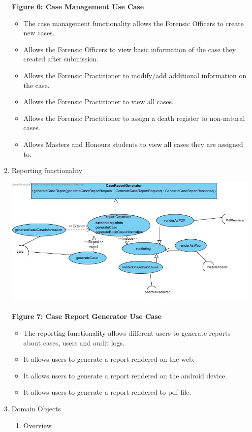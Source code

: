 \documentclass[10pt,a4paper]{article}
\begin{document}
\begin{enumerate}
\begin{center}
		\textbf{Figure 6: Case Management Use Case}
	\end{center}
	\begin{itemize}
		\item The case management functionality allows the Forensic Officers to create new cases.
		\item Allows the Forensic Officers to view basic information of the case they created after submission.
		\item Allows the Forensic Practitioner to modify/add additional information on the case.
		\item Allows the Forensic Practitioner to view all cases.
		\item Allows the Forensic Practitioner to assign a death register to non-natural cases.
		\item Allows Masters and Honours students to view all cases they are assigned to.
	\end{itemize}
	\item Reporting functionality
		\begin{center}
			\includegraphics[scale=0.4]{caseGeneratorReport.jpg}
			
			\textbf{Figure 7: Case Report Generator Use Case}
		\end{center}
		\begin{itemize}
			\item The reporting functionality allows different users to generate reports about cases, users and audit logs.
			\item It allows users to generate a report rendered on the web.
			\item It allows users to generate a report rendered on the android device.
			\item It allows users to generate a report rendered to pdf file.
		\end{itemize}
	\item Domain Objects
	\begin{enumerate}
		\item Overview
\end{enumerate}
\end{enumerate}
\end{document}
